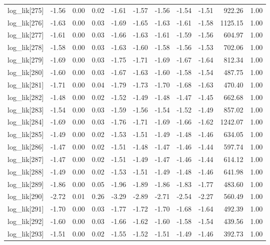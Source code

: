 \begin{table}[ht]
\begin{tabular}{rrrrrrrrrrr}
  log\_lik[275] & -1.56 & 0.00 & 0.02 & -1.61 & -1.57 & -1.56 & -1.54 & -1.51 & 922.26 & 1.00 \\ 
  log\_lik[276] & -1.63 & 0.00 & 0.03 & -1.69 & -1.65 & -1.63 & -1.61 & -1.58 & 1125.15 & 1.00 \\ 
  log\_lik[277] & -1.61 & 0.00 & 0.03 & -1.66 & -1.63 & -1.61 & -1.59 & -1.56 & 604.97 & 1.00 \\ 
  log\_lik[278] & -1.58 & 0.00 & 0.03 & -1.63 & -1.60 & -1.58 & -1.56 & -1.53 & 702.06 & 1.00 \\ 
  log\_lik[279] & -1.69 & 0.00 & 0.03 & -1.75 & -1.71 & -1.69 & -1.67 & -1.64 & 812.34 & 1.00 \\ 
  log\_lik[280] & -1.60 & 0.00 & 0.03 & -1.67 & -1.63 & -1.60 & -1.58 & -1.54 & 487.75 & 1.00 \\ 
  log\_lik[281] & -1.71 & 0.00 & 0.04 & -1.79 & -1.73 & -1.70 & -1.68 & -1.63 & 470.40 & 1.00 \\ 
  log\_lik[282] & -1.48 & 0.00 & 0.02 & -1.52 & -1.49 & -1.48 & -1.47 & -1.45 & 662.68 & 1.00 \\ 
  log\_lik[283] & -1.54 & 0.00 & 0.03 & -1.59 & -1.56 & -1.54 & -1.52 & -1.49 & 857.02 & 1.00 \\ 
  log\_lik[284] & -1.69 & 0.00 & 0.03 & -1.76 & -1.71 & -1.69 & -1.66 & -1.62 & 1242.07 & 1.00 \\ 
  log\_lik[285] & -1.49 & 0.00 & 0.02 & -1.53 & -1.51 & -1.49 & -1.48 & -1.46 & 634.05 & 1.00 \\ 
  log\_lik[286] & -1.47 & 0.00 & 0.02 & -1.51 & -1.48 & -1.47 & -1.46 & -1.44 & 597.74 & 1.00 \\ 
  log\_lik[287] & -1.47 & 0.00 & 0.02 & -1.51 & -1.49 & -1.47 & -1.46 & -1.44 & 614.12 & 1.00 \\ 
  log\_lik[288] & -1.49 & 0.00 & 0.02 & -1.53 & -1.51 & -1.49 & -1.48 & -1.46 & 641.98 & 1.00 \\ 
  log\_lik[289] & -1.86 & 0.00 & 0.05 & -1.96 & -1.89 & -1.86 & -1.83 & -1.77 & 483.60 & 1.00 \\ 
  log\_lik[290] & -2.72 & 0.01 & 0.26 & -3.29 & -2.89 & -2.71 & -2.54 & -2.27 & 560.49 & 1.00 \\ 
  log\_lik[291] & -1.70 & 0.00 & 0.03 & -1.77 & -1.72 & -1.70 & -1.68 & -1.64 & 492.39 & 1.00 \\ 
  log\_lik[292] & -1.60 & 0.00 & 0.03 & -1.66 & -1.62 & -1.60 & -1.58 & -1.54 & 439.56 & 1.00 \\ 
  log\_lik[293] & -1.51 & 0.00 & 0.02 & -1.55 & -1.52 & -1.51 & -1.49 & -1.46 & 392.73 & 1.00 \\ 

\end{tabular}
\end{table}
